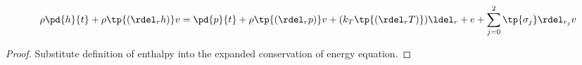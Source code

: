 \begin{thm}
\begin{equation}
    \rho \pd{h}{t} + \rho \tp{(\rdel_r h )} v  = 
    \pd{p}{t} + \rho \tp{(\rdel_r p )} v +
    (k_T \tp{\left( \rdel_r T\right)} ) \ldel_r + e + \sum_{j=0}^2 \tp{\sigma_j} \rdel_{r_j} v
\end{equation}
\end{thm}
\begin{proof}
Substitute definition of enthalpy into the expanded conservation of energy equation.
\end{proof}



